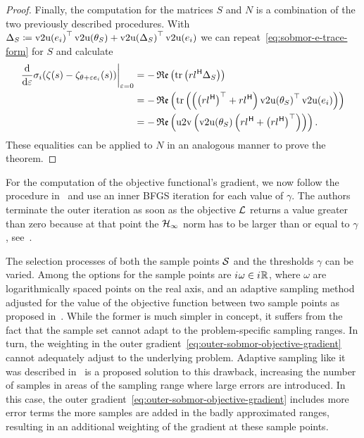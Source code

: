 \begin{proof}
    Finally, the computation for the matrices $S$ and $N$ is a combination of the two previously described procedures.
    With $\Delta_S \coloneqq {\mathop{}\!\mathrm{v}2\mathrm{u}(e_i)}^{\top} \mathop{}\!\mathrm{v}2\mathrm{u}(\theta_S) + {\mathop{}\!\mathrm{v}2\mathrm{u}(\Delta_S)}^{\top} \mathop{}\!\mathrm{v}2\mathrm{u}(e_i)$ we can repeat~\eqref{eq:sobmor-e-trace-form} for $S$ and calculate
    \begin{equation*}
        \begin{aligned}
            \res{\frac{\dif}{\dif \varepsilon} \sigma_i(\tfunc(s) - \tfunc_{\theta + \varepsilon e_i}(s))}{\varepsilon = 0} &= - \re{\trace{r l\herm \Delta_S}} \\
            &= - \re{\trace{\left( {\left( r l\herm \right)}\trans + r l\herm \right) {\vecupper(\theta_S)}\trans \vecupper(e_i)}} \\
            &= - \re{\uppervec\left( \vecupper(\theta_S) \left( r l\herm + {\left( r l\herm \right)}\trans \right) \right)}.
        \end{aligned}
    \end{equation*}
    These equalities can be applied to $N$ in an analogous manner to prove the theorem.
\end{proof}

For the computation of the objective functional's gradient, we now follow the procedure in~\cite{SV2023} and use an inner \ac{BFGS} iteration for each value of $\gamma$.
The authors terminate the outer iteration as soon as the objective $\mathcal{L}$ returns a value greater than zero because at that point the $\mathcal{H}_\infty$ norm has to be larger than or equal to $\gamma$, see~\cite[Section~3.2.2]{SV2023}.

The selection processes of both the sample points $\mathcal{S}$ and the thresholds $\gamma$ can be varied.
Among the options for the sample points are ${i\mkern1mu} \omega \in {i\mkern1mu} \mathbb{R}$, where $\omega$ are logarithmically spaced points on the real axis, and an adaptive sampling method adjusted for the value of the objective function between two sample points as proposed in~\cite{SV2021}.
While the former is much simpler in concept, it suffers from the fact that the sample set cannot adapt to the problem-specific sampling ranges.
In turn, the weighting in the outer gradient~\eqref{eq:outer-sobmor-objective-gradient} cannot adequately adjust to the underlying problem.
Adaptive sampling like it was described in~\cite{SV2021} is a proposed solution to this drawback, increasing the number of samples in areas of the sampling range where large errors are introduced.
In this case, the outer gradient~\eqref{eq:outer-sobmor-objective-gradient} includes more error terms the more samples are added in the badly approximated ranges, resulting in an additional weighting of the gradient at these sample points.

\vspace{3em}
